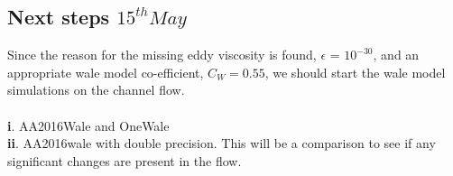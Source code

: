 \subsection{Next steps $15^{th} May$}

Since the reason for the missing eddy viscosity is found, $\epsilon$ = $10^{-30}$, and an appropriate wale model co-efficient, $C_{W} = 0.55$, we should start the wale model simulations on the channel flow.
\\
\\
{\bf i}. AA2016Wale and OneWale\\
{\bf ii}. AA2016wale with double precision. This will be a comparison to see if any significant changes are present in the flow.